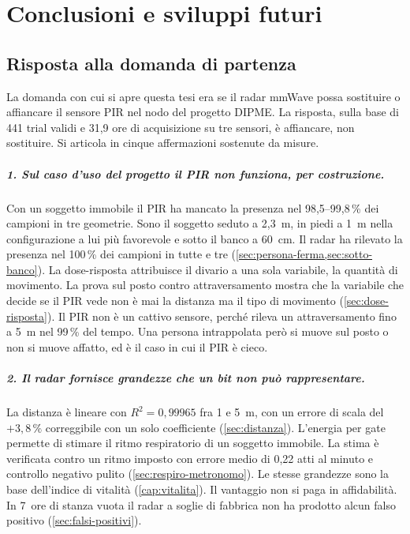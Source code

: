 \chapter{Conclusioni e sviluppi futuri}
\label{cap:conclusioni}

\section{Risposta alla domanda di partenza}
\label{sec:conclusioni-risposta}

La domanda con cui si apre questa tesi era se il radar mmWave possa sostituire o
affiancare il sensore PIR nel nodo del progetto DIPME. La risposta, sulla base di
441 trial validi e 31,9 ore di acquisizione su tre sensori, è affiancare, non
sostituire. Si articola in cinque affermazioni sostenute da misure.

\paragraph{1. Sul caso d'uso del progetto il PIR non funziona, per costruzione.} Con
un soggetto immobile il PIR ha mancato la presenza nel 98,5--99,8\,\% dei campioni in
tre geometrie. Sono il soggetto seduto a 2,3~m, in piedi a 1~m nella configurazione a
lui più favorevole e sotto il banco a 60~cm. Il radar ha rilevato la presenza nel
100\,\% dei campioni in tutte e tre (\cref{sec:persona-ferma,sec:sotto-banco}). La
dose-risposta attribuisce il divario a una sola variabile, la quantità di movimento.
La prova sul posto contro attraversamento mostra che la variabile che decide se il
PIR vede non è mai la distanza ma il tipo di movimento (\cref{sec:dose-risposta}). Il
PIR non è un cattivo sensore, perché rileva un attraversamento fino a 5~m nel 99\,\%
del tempo. Una persona intrappolata però si muove sul posto o non si muove affatto,
ed è il caso in cui il PIR è cieco.

\paragraph{2. Il radar fornisce grandezze che un bit non può rappresentare.} La
distanza è lineare con $R^2 = 0{,}99965$ fra 1 e 5~m, con un errore di scala del
$+3{,}8\,\%$ correggibile con un solo coefficiente (\cref{sec:distanza}). L'energia
per gate permette di stimare il ritmo respiratorio di un soggetto immobile. La stima è
verificata contro un ritmo imposto con errore medio di 0,22 atti al minuto e controllo
negativo pulito (\cref{sec:respiro-metronomo}). Le stesse grandezze sono la base
dell'indice di vitalità (\cref{cap:vitalita}). Il vantaggio non si paga in
affidabilità. In 7~ore di stanza vuota il radar a soglie di fabbrica non ha prodotto
alcun falso positivo (\cref{sec:falsi-positivi}).

